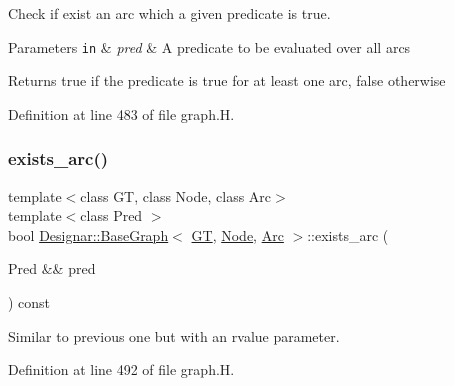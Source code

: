 Check if exist an arc which a given predicate is true. 


\begin{DoxyParams}[1]{Parameters}
\mbox{\tt in}  & {\em pred} & A predicate to be evaluated over all arcs \\
\hline
\end{DoxyParams}
\begin{DoxyReturn}{Returns}
{\ttfamily true} if the predicate is true for at least one arc, {\ttfamily false} otherwise 
\end{DoxyReturn}


Definition at line 483 of file graph.\+H.

\mbox{\label{class_designar_1_1_base_graph_aebf517d972db553b03f2c4dbe4228d79}} 
\subsubsection{\texorpdfstring{exists\+\_\+arc()}{exists\_arc()}\hspace{0.1cm}{\footnotesize\ttfamily [2/2]}}
{\footnotesize\ttfamily template$<$class GT, class Node, class Arc$>$ \\
template$<$class Pred $>$ \\
bool \hyperlink{class_designar_1_1_base_graph}{Designar\+::\+Base\+Graph}$<$ \hyperlink{demo-buildgraph_8_c_a3001c40d2c31ca87ed96cd7d1334a55e}{GT}, \hyperlink{namespace_designar_a5af326c65aa2bd26b26c410f2030d09e}{Node}, \hyperlink{namespace_designar_a3f55fb5513d62ff47cbc8f72b8e95d6f}{Arc} $>$\+::exists\+\_\+arc (\begin{DoxyParamCaption}\item[{Pred \&\&}]{pred }\end{DoxyParamCaption}) const\hspace{0.3cm}{\ttfamily [inline]}}



Similar to previous one but with an rvalue parameter. 



Definition at line 492 of file graph.\+H.

\mbox{\label{class_designar_1_1_base_graph_a3631470de61b819211c72fdd2ac31b34}} 
